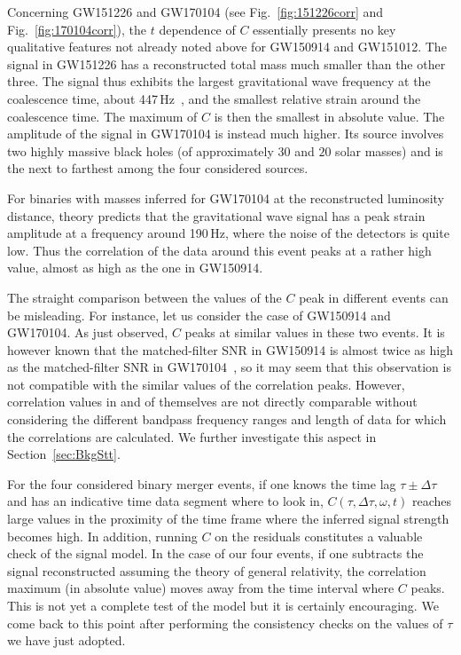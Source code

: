 \documentclass[a4paper,11pt]{article}
\begin{document}
Concerning GW151226 and GW170104 (see Fig.~\ref{fig:151226corr} and Fig.~\ref{fig:170104corr}), the $t$ dependence of $C$  essentially presents no key qualitative features not already noted above for GW150914 and GW151012. 
The signal in GW151226 has a reconstructed total mass much smaller than the other three. The signal thus exhibits the largest gravitational wave frequency at the coalescence time, about 447\,Hz~\cite{Vallisneri:2014vxa}, and the smallest relative strain around the coalescence time. The maximum of $C$ is then the smallest in absolute value. The amplitude of the signal in GW170104 is instead much higher. Its source involves two highly massive black holes (of approximately $30$ and $20$ solar masses) and is the next to farthest among the four considered sources.

For binaries with masses inferred for GW170104 at the reconstructed luminosity distance, theory predicts that the gravitational wave signal has a peak strain amplitude at a frequency around 190\,Hz, where the noise of the detectors is quite low. Thus the correlation of the data around this event peaks at a rather high value, almost as high as the one in GW150914.

The straight comparison between the values of the $C$ peak in different events can be misleading. For instance, let us consider the case of GW150914 and GW170104. As just observed, $C$ peaks at similar values in these two events. It is however known that the matched-filter SNR in GW150914 is almost twice as high as the matched-filter SNR in GW170104~\cite{LIGOScientific:2018mvr}, so it may seem that this observation is not compatible with the similar values of the correlation peaks. However, correlation values in and of themselves are not directly comparable without considering the different bandpass frequency ranges and length of data for which the correlations are calculated. We further investigate this aspect in Section~\ref{sec:BkgStt}.

For the four considered binary merger events, if one knows the time lag $\tau \pm \Delta \tau$ and has an indicative time data segment where to look in, $C(\tau, \Delta \tau, \omega, t)$ reaches large values in the proximity of the time frame where the inferred signal strength becomes high. In addition, running $C$ on the residuals constitutes a valuable check of the signal model. In the case of our four events, if one subtracts the signal reconstructed assuming the theory of general relativity, the correlation maximum (in absolute value) moves away from the time interval where $C$ peaks. This is not yet a complete test of the model but it is certainly encouraging. We come back to this point after performing the consistency checks on the values of $\tau$ we have just adopted.
\end{document}
